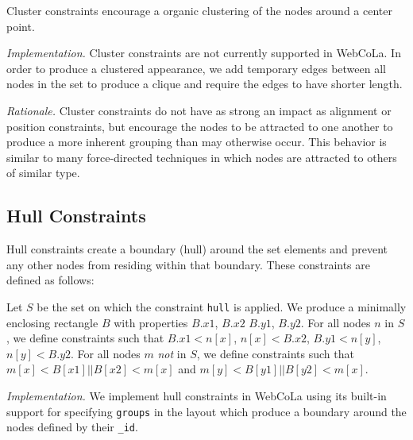 Cluster constraints encourage a organic clustering of the nodes around
a center point.


\emph{Implementation.}
Cluster constraints are not currently supported in WebCoLa. In order to
produce a clustered appearance, we add temporary edges between all nodes
in the set to produce a clique and require the edges to have shorter length.

\emph{Rationale.}
Cluster constraints do not have as strong an impact as alignment or
position constraints, but encourage the nodes to be attracted to one
another to produce a more inherent grouping than may otherwise occur.
This behavior is similar to many force-directed techniques in which
nodes are attracted to others of similar type.


\subsection{Hull Constraints}

Hull constraints create a boundary (hull) around the set elements and prevent any other nodes from residing within that boundary. These 
constraints are defined as follows:

\begin{definition}
Let $S$ be the set on which the constraint \texttt{hull} is applied. We produce a minimally enclosing rectangle $B$ with properties $B.x1$, $B.x2$ $B.y1$, $B.y2$. For all nodes
$n$ in $S$, we define constraints such that $B.x1 < n[x]$, $n[x] < B.x2$,
$B.y1 < n[y]$, $n[y] < B.y2$. For all nodes $m$ \emph{not} in $S$, we define
constraints such that $m[x] < B[x1] || B[x2] < m[x]$ and $m[y] < B[y1] || B[y2] < m[x]$.
\end{definition}

\emph{Implementation.}
We implement hull constraints in WebCoLa using its built-in support for 
specifying \texttt{groups} in the layout which produce a boundary around 
the nodes defined by their \texttt{\_id}.

